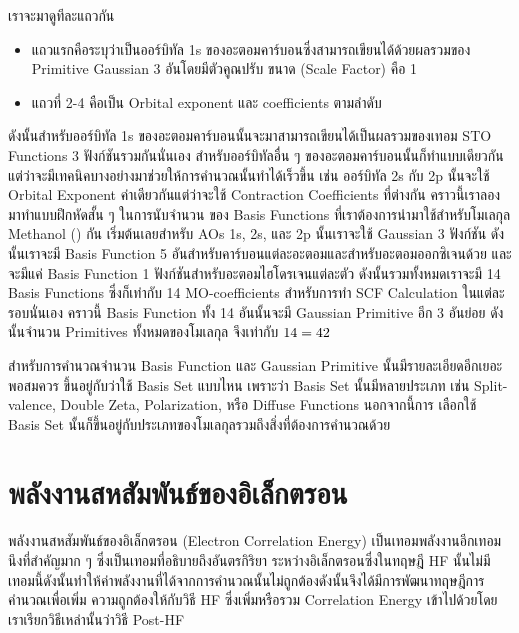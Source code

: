 เราจะมาดูทีละแถวกัน

\begin{itemize}
    \item แถวแรกคือระบุว่าเป็นออร์บิทัล 1s ของอะตอมคาร์บอนซึ่งสามารถเขียนได้ด้วยผลรวมของ Primitive Gaussian 3 อันโดยมีตัวคูณปรับ%
          ขนาด (Scale Factor) คือ 1

    \item แถวที่ 2-4 คือเป็น Orbital exponent และ  coefficients ตามลำดับ
\end{itemize}

\noindent ดังนั้นสำหรับออร์บิทัล 1s ของอะตอมคาร์บอนนั้นจะมาสามารถเขียนได้เป็นผลรวมของเทอม STO Functions 3 ฟังก์ชันรวมกันนั่นเอง
สำหรับออร์บิทัลอื่น ๆ ของอะตอมคาร์บอนนั้นก็ทำแบบเดียวกันแต่ว่าจะมีเทคนิคบางอย่างมาช่วยให้การคำนวณนั้นทำได้เร็วขึ้น เช่น ออร์บิทัล 2s กับ 2p
นั้นจะใช้ Orbital Exponent ค่าเดียวกันแต่ว่าจะใช้ Contraction Coefficients ที่ต่างกัน คราวนี้เราลองมาทำแบบฝึกหัดสั้น ๆ ในการนับจำนวน%
ของ Basis Functions ที่เราต้องการนำมาใช้สำหรับโมเลกุล Methanol () กัน เริ่มต้นเลยสำหรับ AOs 1s, 2s, และ 2p นั้นเราจะใช้
Gaussian 3 ฟังก์ชัน ดังนั้นเราจะมี Basis Function 5 อันสำหรับคาร์บอนแต่ละอะตอมและสำหรับอะตอมออกซิเจนด้วย และจะมีแค่ Basis Function
1 ฟังก์ชันสำหรับอะตอมไฮโดรเจนแต่ละตัว ดังนั้นรวมทั้งหมดเราจะมี 14 Basis Functions ซึ่งก็เท่ากับ 14 MO-coefficients สำหรับการทำ SCF
Calculation ในแต่ละรอบนั่นเอง คราวนี้ Basis Function ทั้ง 14 อันนั้นจะมี Gaussian Primitive อีก 3 อันย่อย ดังนั้นจำนวน Primitives
ทั้งหมดของโมเลกุล  จึงเท่ากับ $14 \time 3 = 42$

สำหรับการคำนวณจำนวน Basis Function และ Gaussian Primitive นั้นมีรายละเอียดอีกเยอะพอสมควร ขึ้นอยู่กับว่าใช้ Basis Set แบบไหน
เพราะว่า Basis Set นั้นมีหลายประเภท เช่น Split-valence, Double Zeta, Polarization, หรือ Diffuse Functions นอกจากนี้การ%
เลือกใช้ Basis Set นั้นก็ขึ้นอยู่กับประเภทของโมเลกุลรวมถึงสิ่งที่ต้องการคำนวณด้วย

\section{พลังงานสหสัมพันธ์ของอิเล็กตรอน}

พลังงานสหสัมพันธ์ของอิเล็กตรอน (Electron Correlation Energy) เป็นเทอมพลังงานอีกเทอมนึงที่สำคัญมาก ๆ ซึ่งเป็นเทอมที่อธิบายถึงอันตรกิริยา%
ระหว่างอิเล็กตรอนซึ่งในทฤษฎี HF นั้นไม่มีเทอมนี้ดังนั้นทำให้ค่าพลังงานที่ได้จากการคำนวณนั้นไม่ถูกต้องดังนั้นจึงได้มีการพัฒนาทฤษฎีการคำนวณเพื่อเพิ่ม%
ความถูกต้องให้กับวิธี HF ซึ่งเพิ่มหรือรวม Correlation Energy เข้าไปด้วยโดยเราเรียกวิธีเหล่านั้นว่าวิธี Post-HF

